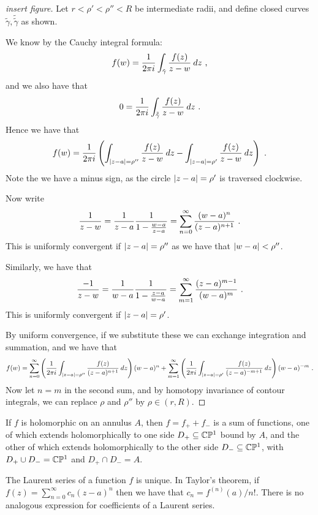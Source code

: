 \begin{proof}
[insert figure]

Let $r < \rho' < \rho'' < R$ be intermediate radii, and define closed curves $\tilde{\gamma}, \tilde{\tilde{\gamma}}$ as shown.

We know by the Cauchy integral formula:
\[
f(w) = \frac{1}{2 \pi i}\int_{\tilde{\gamma}} \frac{f(z)}{z - w} \: dz \ \text{,}
\]
and we also have that
\[
0 = \frac{1}{2 \pi i}\int_{\tilde{\tilde{\gamma}}} \frac{f(z)}{z - w} \: dz \ \text{.}
\]
Hence we have that
\[
f(w) = \frac{1}{2 \pi i} \left( \int_{\lvert z - a\rvert = \rho''} \frac{f(z)}{z - w} \: dz - \int_{\lvert z - a\rvert = \rho'} \frac{f(z)}{z - w} \: dz \right) \ \text{.}
\]
Note the we have a minus sign, as the circle $\lvert z - a\rvert = \rho'$ is traversed clockwise.

Now write
\[
\frac{1}{z - w} = \frac{1}{z - a}\frac{1}{1 - \frac{w - a}{z - a}} = \sum_{n = 0}^\infty \frac{(w - a)^n}{(z - a)^{n+1}} \ \text{.}
\]
This is uniformly convergent if $\lvert z - a\rvert = \rho''$ as we have that $\lvert w - a\rvert < \rho''$.

Similarly, we have that
\[
\frac{-1}{z - w} = \frac{1}{w - a}\frac{1}{1 - \frac{z - a}{w - a}} = \sum_{m = 1}^\infty \frac{(z - a)^{m-1}}{(w-a)^m} \ \text{.}
\]
This is uniformly convergent if $\lvert z - a\rvert = \rho'$.

By uniform convergence, if we substitute these we can exchange integration and summation, and we have that
\[
f(w) = \sum_{n = 0}^\infty \left(\frac{1}{2 \pi i} \int_{\lvert z - a\rvert = \rho''} \frac{f(z)}{(z - a)^{n + 1}} \: dz \right)(w-a)^n + \sum_{m = 1}^\infty \left( \frac{1}{2 \pi i} \int_{\lvert z - a\rvert = \rho'} \frac{f(z)}{(z - a)^{-m+1}} \: dz \right) (w - a)^{-m} \ \text{.}
\]
Now let $n = m$ in the second sum, and by homotopy invariance of contour integrals, we can replace $\rho$ and  $\rho''$ by $\rho \in (r, R)$.
\end{proof}

\begin{corollary}
If $f$ is holomorphic on an annulus $A$, then $f = f_+ + f_-$ is a sum of functions, one of which extends holomorphically to one side $D_+ \subseteq \mathbb{C}\mathbb{P}^1$ bound by $A$, and the other of which extends holomorphically to the other side $D_- \subseteq \mathbb{C}\mathbb{P}^1$, with $D_+ \cup D_- = \mathbb{C}\mathbb{P}^1$ and $D_+ \cap D_- = A$.
\end{corollary}

\begin{remark}
  The Laurent series of a function $f$ is unique.
In Taylor's theorem, if $f(z) = \sum_{n=0}^\infty c_n(z-a)^n$ then we have that $c_n = f^{(n)}(a)/n!$.
There is no analogous expression for coefficients of a Laurent series.
\end{remark}


